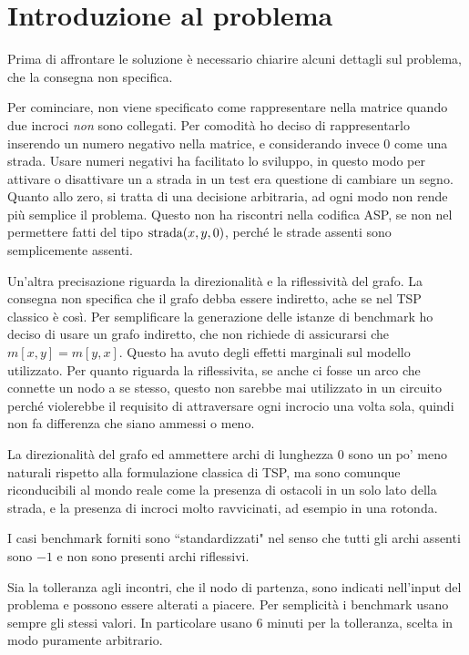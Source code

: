 \documentclass[11pt, a4paper]{article}
\begin{document}
\newpage

\tableofcontents

\newpage

\section{Introduzione al problema}

Prima di affrontare le soluzione è necessario chiarire alcuni dettagli sul problema, che la consegna non specifica.

Per cominciare, non viene specificato come rappresentare nella matrice quando due incroci \emph{non} sono collegati. Per comodità ho deciso di rappresentarlo inserendo un numero negativo nella matrice, e considerando invece $0$ come una strada.
Usare numeri negativi ha facilitato lo sviluppo, in questo modo per attivare o disattivare un a strada in un test era questione di cambiare un segno. Quanto allo zero, si tratta di una decisione arbitraria, ad ogni modo non rende più semplice il problema.
Questo non ha riscontri nella codifica ASP, se non nel permettere fatti del tipo $\text{\lstinline{strada}}(x,y,0)$, perché le strade assenti sono semplicemente assenti.

Un'altra precisazione riguarda la direzionalità e la riflessività del grafo. La consegna non specifica che il grafo debba essere indiretto, ache se nel TSP classico è così.
Per semplificare la generazione delle istanze di benchmark ho deciso di usare un grafo indiretto, che non richiede di assicurarsi che $m[x,y]=m[y,x]$. Questo ha avuto degli effetti marginali sul modello utilizzato.
Per quanto riguarda la riflessivita, se anche ci fosse un arco che connette un nodo a se stesso, questo non sarebbe mai utilizzato in un circuito perché violerebbe il requisito di attraversare ogni incrocio una volta sola, quindi non fa differenza che siano ammessi o meno.

La direzionalità del grafo ed ammettere archi di lunghezza $0$ sono un po' meno naturali rispetto alla formulazione classica di TSP, ma sono comunque riconducibili al mondo reale come la presenza di ostacoli in un solo lato della strada, e la presenza di incroci molto ravvicinati, ad esempio in una rotonda.

I casi benchmark forniti sono ``standardizzati" nel senso che tutti gli archi assenti sono $-1$ e non sono presenti archi riflessivi.

Sia la tolleranza agli incontri, che il nodo di partenza, sono indicati nell'input del problema e possono essere alterati a piacere. Per semplicità i benchmark usano sempre gli stessi valori. In particolare usano $6$ minuti per la tolleranza, scelta in modo puramente arbitrario.
\end{document}
